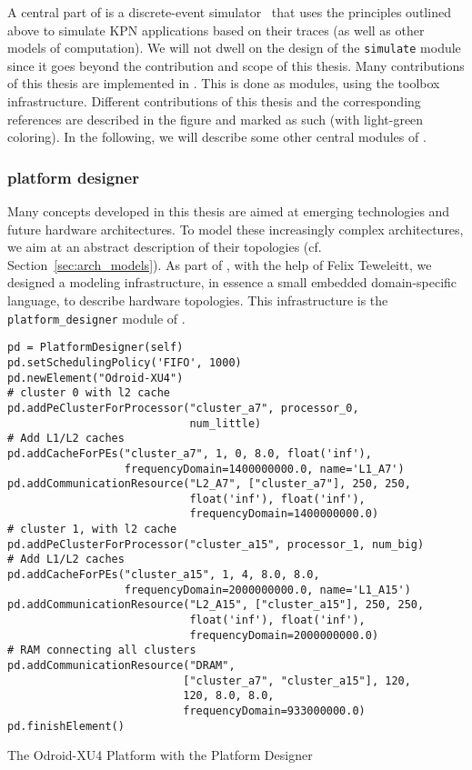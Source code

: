 A central part of \mocasin is a discrete-event simulator~\cite{menard_norcas16} that uses the principles outlined above to simulate KPN applications based on their traces (as well as other models of computation).
We will not dwell on the design of the \texttt{simulate} module since it goes beyond the contribution and scope of this thesis.
Many contributions of this thesis are implemented in \mocasin. 
This is done as modules, using the \mocasin toolbox infrastructure. 
Different contributions of this thesis and the corresponding references are described in the figure and marked as such (with light-green coloring).
In the following, we will describe some other central modules of \mocasin. 

\subsubsection{platform designer}

Many concepts developed in this thesis are aimed at emerging technologies and future hardware architectures.
To model these increasingly complex architectures, we aim at an abstract description of their topologies (cf. Section~\ref{sec:arch_models}).
As part of \mocasin, with the help of Felix Teweleitt, we designed a modeling infrastructure, in essence a small embedded domain-specific language, to describe hardware topologies.
This infrastructure is the \texttt{platform\_designer} module of \mocasin.

\begin{listing}
\begin{verbatim}
pd = PlatformDesigner(self)
pd.setSchedulingPolicy('FIFO', 1000)
pd.newElement("Odroid-XU4")
# cluster 0 with l2 cache
pd.addPeClusterForProcessor("cluster_a7", processor_0,
                            num_little)
# Add L1/L2 caches
pd.addCacheForPEs("cluster_a7", 1, 0, 8.0, float('inf'),
                  frequencyDomain=1400000000.0, name='L1_A7')
pd.addCommunicationResource("L2_A7", ["cluster_a7"], 250, 250,
                            float('inf'), float('inf'),
                            frequencyDomain=1400000000.0)
# cluster 1, with l2 cache
pd.addPeClusterForProcessor("cluster_a15", processor_1, num_big)
# Add L1/L2 caches
pd.addCacheForPEs("cluster_a15", 1, 4, 8.0, 8.0,
                  frequencyDomain=2000000000.0, name='L1_A15')
pd.addCommunicationResource("L2_A15", ["cluster_a15"], 250, 250,
                            float('inf'), float('inf'),
                            frequencyDomain=2000000000.0)
# RAM connecting all clusters
pd.addCommunicationResource("DRAM",
                           ["cluster_a7", "cluster_a15"], 120,
                           120, 8.0, 8.0,
                           frequencyDomain=933000000.0)
pd.finishElement()
\end{verbatim}
\caption{The Odroid-XU4 Platform with the Platform Designer}
\label{listing:designer_odroid}
\end{listing}

